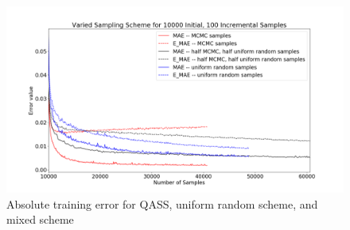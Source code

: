 \begin{figure}[h]
  \centering
    \includegraphics[width=0.8\linewidth]{fig7_qasssampling.png}
    \caption{Absolute training error for QASS, uniform random scheme, and mixed scheme}
  \label{fig:pca}
\end{figure}
